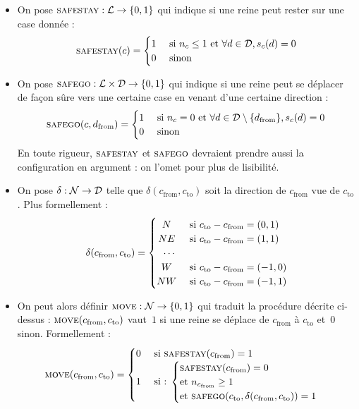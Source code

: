  \begin{itemize}
  \item{On pose $\textsc{safestay} : {\mathcal{L}}\to\{0,1\}$ qui indique si une reine peut rester sur une case donnée : \[
 \Ss(c) =
  \begin{cases} 
      \hfill 1    \hfill & \text{ si $n_c\leq 1$ et $\forall d \in \D, s_c(d)=0$} \\
      \hfill 0 \hfill & \text{ sinon} \\
  \end{cases}
\]}
 
  \item{On pose $\textsc{safego} :  {\mathcal{L}\times\mathcal{D}}\to\{0,1\}$ qui indique si une reine peut se déplacer de façon sûre vers une certaine case en venant d'une certaine direction : \[
 \Sg(c, d_{\mathrm {from}}) =
  \begin{cases} 
      \hfill 1    \hfill & \text{ si $n_c=0$ et $\forall d \in \D\setminus\{d_{\mathrm{from}}\}, s_c(d)=0$} \\
      \hfill 0 \hfill & \text{ sinon} \\
  \end{cases}
\]
 En toute rigueur, $\textsc{safestay}$ et $\textsc{safego}$ devraient prendre aussi la configuration en argument : on l'omet pour plus de lisibilité.
}
\medskip
  \item{On pose $\delta :\mathcal{N}\to\mathcal{D}$ telle que $\delta(c_{\mathrm{from}}, c_{\mathrm{to}})$ soit la direction de $c_{\mathrm{from}}$ vue de $c_{\mathrm{to}}$. Plus formellement : \[
 \delta(c_{\mathrm{from}}, c_{\mathrm{to}}) =
  \begin{cases} 
    \hfill N    \hfill & \text{ si $c_{\mathrm{to}}-c_{\mathrm{from}}=(0,1)$} \\
    \hfill NE \hfill & \text{ si  $c_{\mathrm{to}}-c_{\mathrm{from}}=(1,1)$} \\
    \hfill \cdots & \\
    \hfill W \hfill & \text{ si  $c_{\mathrm{to}}-c_{\mathrm{from}}= (-1,0)$}\\
    \hfill NW \hfill & \text { si  $c_{\mathrm{to}}-c_{\mathrm{from}}=(-1,1)$}\\
  \end{cases}
\] }
  \item{On peut alors définir $\textsc{move} :{\mathcal{N}}\to\{0,1\}$ qui traduit la procédure décrite ci-dessus : $\textsc{move}(c_{\mathrm{from}}, c_{\mathrm{to}})$ vaut~$1$ si une reine se déplace de $c_{\mathrm{from}}$ à $c_{\mathrm{to}}$ et~$0$ sinon. Formellement : \[
    \M(c_{\mathrm{from}}, c_{\mathrm{to}}) = 
    \begin{cases}
      \hfill 0 \hfill & \text{ si $\Ss(c_{\mathrm{from}})=1$} \\
      \hfill 1 \hfill & \text{ si : }{ \begin{cases} \Ss(c_{\mathrm{from}})=0 \\\text{et $n_{c_{\mathrm{from}}}\geq 1$} \\ \text{et } \Sg(c_{\mathrm{to}}, \delta(c_{\mathrm{from}}, c_{\mathrm{to}}))=1\\ \end{cases}}\\


\end{cases}\]}
\end{itemize}
